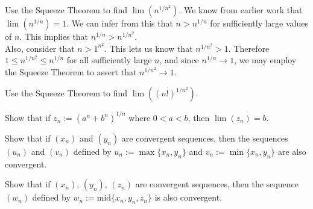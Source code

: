 \documentclass[paper=a4, fontsize=11pt]{scrartcl} %
\numberwithin{equation}{section} %
\numberwithin{figure}{section} %
\numberwithin{table}{section} %
\begin{document}
 Use the Squeeze Theorem to find $\lim(n^{1/n^2})$.
\pf We know from earlier work that $\lim(n^{1/n}) = 1$. We can infer from this that $n > n^{1/n}$ for sufficiently large values of $n$. This implies that $n^{1/n} > n^{1/n^2}$.\\

Also, consider that $n > 1^{n^2}$. This lets us know that $n^{1/n^2} > 1$. Therefore $1 \leq n^{1/n^2} \leq n^{1/n}$ for all sufficiently large $n$, and since $n^{1/n} \rightarrow 1$, we may employ the Squeeze Theorem to assert that $n^{1/n^2} \rightarrow 1$. \done

 Use the Squeeze Theorem to find $\lim((n!)^{1/n^2})$.
\pf

 Show that if $z_n := (a^n + b^n)^{1/n}$ where $0 < a < b$, then $\lim(z_n) = b$.
\pf

 Show that if $(x_n)$ and $(y_n)$ are convergent sequences, then the sequences $(u_n)$ and $(v_n)$ defined by $u_n := \max\{x_n, y_n\}$ and $v_n := \min\{x_n, y_n\}$ are also convergent.
\pf

 Show that if $(x_n)$, $(y_n)$, $(z_n)$ are convergent sequences, then the sequence $(w_n)$ defined by $w_n := \text{mid}\{x_n, y_n, z_n\}$ is also convergent.
\pf
\end{document}
